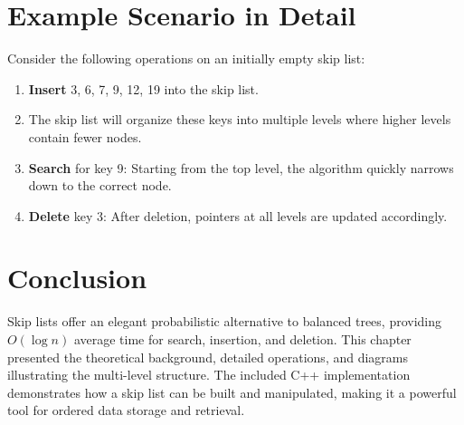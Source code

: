 \section{Example Scenario in Detail}
Consider the following operations on an initially empty skip list:
\begin{enumerate}
    \item \textbf{Insert} 3, 6, 7, 9, 12, 19 into the skip list.
    \item The skip list will organize these keys into multiple levels where higher levels contain fewer nodes.
    \item \textbf{Search} for key 9: Starting from the top level, the algorithm quickly narrows down to the correct node.
    \item \textbf{Delete} key 3: After deletion, pointers at all levels are updated accordingly.
\end{enumerate}

\section{Conclusion}
Skip lists offer an elegant probabilistic alternative to balanced trees, providing \( O(\log n) \) average time for search, insertion, and deletion. This chapter presented the theoretical background, detailed operations, and diagrams illustrating the multi-level structure. The included C++ implementation demonstrates how a skip list can be built and manipulated, making it a powerful tool for ordered data storage and retrieval.
